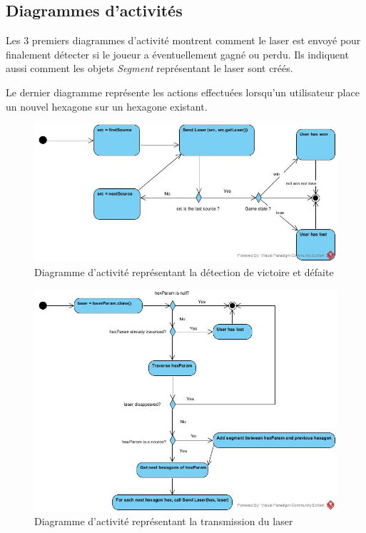 \documentclass[]{article}
\begin{document}
\subsection{Diagrammes d'activités}

Les 3 premiers diagrammes d'activité montrent comment le laser est envoyé pour finalement détecter si le joueur a éventuellement gagné ou perdu. Ils indiquent aussi comment les objets \emph{Segment} représentant le laser sont créés.

Le dernier diagramme représente les actions effectuées lorsqu'un utilisateur place un nouvel hexagone sur un hexagone existant.

\begin{figure}[H]
\begin{center}
  \includegraphics[width=\textwidth]{Activity1.jpg}
  \caption{Diagramme d'activité représentant la détection de victoire et défaite}\label{fig:auto}
\end{center}
\end{figure}

\begin{figure}[H]
\begin{center}
  \includegraphics[width=\textwidth]{Activity2.jpg}
  \caption{Diagramme d'activité représentant la transmission du laser}\label{fig:auto}
\end{center}
\end{figure}
\end{document}
